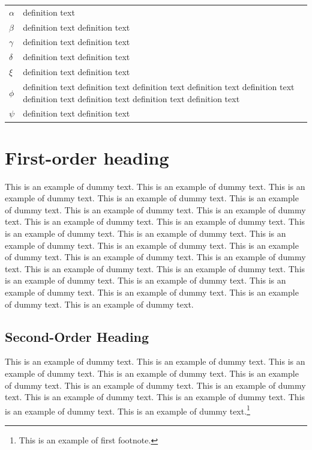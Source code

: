 \documentclass{jpp}
\begin{document}
\noindent\begin{tabular}{@{}l@{\qquad}p{28pc}@{}}
$\alpha$ &  definition text  \\
$\beta$ &  definition text definition text  \\
$\gamma$ &  definition text definition text  \\
$\delta$ &  definition text definition text  \\
$\xi$ &  definition text definition text \\
$\phi$ &  definition text definition text definition text definition text definition text definition
text definition text definition text definition text \\
$\psi$ &  definition text definition text \\
\end{tabular}

\section{First-order heading}

This is an example of dummy text. This is an example of dummy text. This is an example of
dummy text. This is an example of dummy text. This is an example of dummy text. This is
an example of dummy text. This is an example of dummy text. This is an example of dummy
text. This is an example of dummy text. This is an example of dummy text. This is an example
of dummy text. This is an example of dummy text. This is an example of dummy text. This is
an example of dummy text. This is an example of dummy text. This is an example of dummy
text. This is an example of dummy text. This is an example of dummy text. This is an example
of dummy text. This is an example of dummy text. This is an example of dummy text. This is
an example of dummy text. This is an example of dummy text. This is an example of dummy
text.

\subsection{Second-Order Heading}

This is an example of dummy text. This is an example of dummy text. This is an example
of dummy text. This is an example of dummy text. This is an example of dummy text. This
is an example of dummy text. This is an example of dummy text. This is an example of
dummy text. This is an example of dummy text. This is an example of dummy text. This is
an example of dummy text.\footnote{This is an example of first footnote.}
\end{document}
